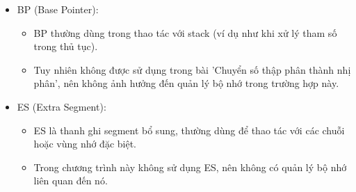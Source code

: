 \begin{itemize}
\item BP (Base Pointer):
\begin{itemize}
    \item BP thường dùng trong thao tác với stack (ví dụ như khi xử lý tham số trong thủ tục).
    \item Tuy nhiên không được sử dụng trong bài 'Chuyển số thập phân thành nhị phân', nên không ảnh hưởng đến quản lý bộ nhớ trong trường hợp này.
\end{itemize}

\item  ES (Extra Segment):
\begin{itemize}
    \item ES là thanh ghi segment bổ sung, thường dùng để thao tác với các chuỗi hoặc vùng nhớ đặc biệt.
    \item Trong chương trình này không sử dụng ES, nên không có quản lý bộ nhớ liên quan đến nó.
\end{itemize}

\end{itemize}